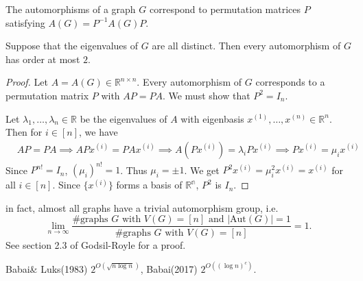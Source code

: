 \begin{corollary}
The automorphisms of a graph $G$ correspond to permutation matrices $P$ satisfying $A(G)=P^{-1}A(G)P$.
\end{corollary}

\begin{theorem}
Suppose that the eigenvalues of $G$ are all distinct. Then every automorphism of $G$ has order at most $2$.
\end{theorem}

\begin{proof}
Let $A=A(G)\in\mathbb{R}^{n\times n}$. Every automorphism of $G$ corresponds to a permutation matrix $P$ with $AP=PA$. We must show that $P^2=I_n$.

Let $\lambda_1,\ldots,\lambda_n\in\mathbb{R}$ be the eigenvalues of $A$ with eigenbasis $x^{(1)},\ldots,x^{(n)}\in\mathbb{R}^n$. Then for $i\in[n]$, we have 
\begin{align*}
&AP=PA\implies APx^{(i)}=PAx^{(i)}\implies A(Px^{(i)})=\lambda_i Px^{(i)}
\implies  Px^{(i)}=\mu_i x^{(i)}
\end{align*}
Since $P^{n!}=I_n$, $(\mu_i)^{n!}=1$. Thus $\mu_i=\pm 1$. We get $P^2x^{(i)}=\mu_i^2x^{(i)}=x^{(i)}$ for all $i\in[n]$. Since $\{x^{(i)}\}$ forms a basis of $\mathbb{R^n}$, $P^2$ is $I_n$.
\end{proof}
\begin{remark}
in fact, almost all graphs have a trivial automorphism group, i.e.
\[\lim_{n\to\infty}\frac{\#\textrm{graphs $G$ with $V(G)=[n]$ and $\left|\mathrm{Aut}(G)\right|=1$}}{\#\textrm{graphs $G$ with $V(G)=[n]$}}=1.\]
See section 2.3 of Godsil-Royle for a proof.
\end{remark}
\begin{remark}
Babai\& Luks(1983)  $2^{O(\sqrt{n\log n})}$, Babai(2017)  $2^{O((\log n)^c)}$.
\end{remark}